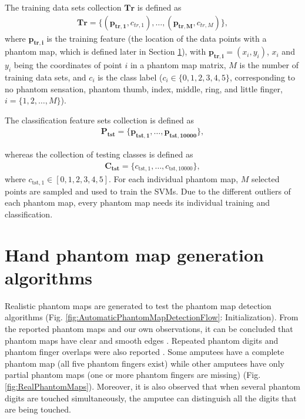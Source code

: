 The training data sets collection $\mathbf{Tr}$ is defined as
\begin{gather}
\label{Eq:TrainingDataSetDefinition}
\mathbf{Tr} =\{ (\mathbf{p_{tr,1}}, c_{tr,1}), \dots ,(\mathbf{p_{tr,M}}, c_{tr,M}) \},
\end{gather}
where $\mathbf{p_{tr,i}}$ is the training feature (the location of the data points with a phantom map, which is defined later in Section \ref{chap2:sec:hand_phantom_map_generation_algorithms}), with $\mathbf{p_{tr,i}} = (x_i, y_i)$, $x_i$ and $y_i$ being the coordinates of point $i$ in a phantom map matrix, $M$ is the number of training data sets, and $c_i$ is the class label ($c_i  \in \{0, 1, 2, 3, 4, 5\}$, corresponding to no phantom sensation, phantom thumb, index, middle, ring, and little finger,  $i = \{1, 2, \dots, M\}$). 

The classification feature sets collection is defined as
\begin{gather}
\label{Eq:TestingFeatureSetDefinition}
\mathbf{P_{tst}} =\{ \mathbf{p_{tst,1}},  \dots ,\mathbf{p_{tst,10000}} \},   
\end{gather}

whereas the collection of testing classes is defined as
\begin{gather}
\label{Eq:TestingClassSetDefinition}
\mathbf{C_{\text{tst}} }=\{ c_{\text{tst},1},  \dots ,c_{\text{tst},10000} \},
\end{gather}
where  $c_{\text{tst},1} \in {[ 0, 1, 2, 3, 4, 5]}$.
For each individual phantom map, $M$ selected points are sampled and used to train the SVMs. Due to the different outliers of each phantom map, every phantom map needs its individual training and classification.


\section{Hand phantom map generation algorithms}
\label{chap2:sec:hand_phantom_map_generation_algorithms}
Realistic phantom maps are generated to test the phantom map detection algorithms  (Fig. \ref{fig:AutomaticPhantomMapDetectionFlow}: Initialization).  
From the reported phantom maps and our own observations, it can be concluded that phantom maps have clear and smooth edges \cite{antfolk2012sensory, zhang2015somatotopical}. Repeated phantom digits and phantom finger overlaps were also reported \cite{zhang2015somatotopical}. Some amputees have a complete phantom map (all five phantom fingers exist) while other amputees have only partial phantom maps (one or more phantom fingers are missing) (Fig. \ref{fig:RealPhantomMaps}). 
Moreover, it is also observed that when several phantom digits are touched simultaneously, the amputee can distinguish all the digits that are being touched. 

